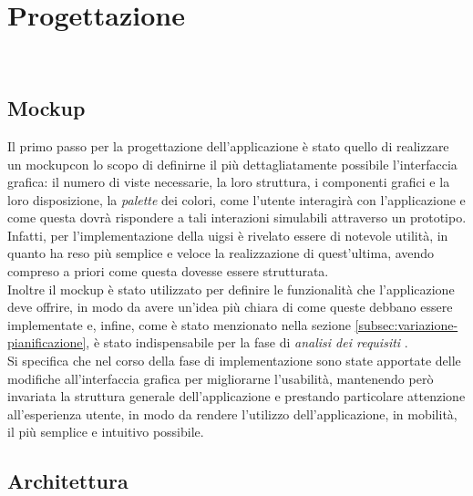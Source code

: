 \chapter{Progettazione}
\label{cap:progettazione}

\\

\section{Mockup}
\label{sec:mockup}

Il primo passo per la progettazione dell'applicazione è stato quello di realizzare un \gls{mockup}\glsoccur con lo scopo di definirne il più dettagliatamente possibile l'interfaccia grafica: il numero di viste necessarie, la loro struttura, i componenti grafici e la loro disposizione, la \emph{palette} dei colori, come l'utente interagirà con l'applicazione e come questa dovrà rispondere a tali interazioni simulabili attraverso un prototipo. Infatti, per l'implementazione della \gls{uig}\glsoccur si è rivelato essere di notevole utilità, in quanto ha reso più semplice e veloce la realizzazione di quest'ultima, avendo compreso a priori come questa dovesse essere strutturata.\\
Inoltre il \gls{mockup} è stato utilizzato per definire le funzionalità che l'applicazione deve offrire, in modo da avere un'idea più chiara di come queste debbano essere implementate e, infine, come è stato menzionato nella sezione \ref{subsec:variazione-pianificazione}, è stato indispensabile per la fase di \emph{analisi dei requisiti} .\\ 
Si specifica che nel corso della fase di implementazione sono state apportate delle modifiche all'interfaccia grafica per migliorarne l'usabilità, mantenendo però invariata la struttura generale dell'applicazione e prestando particolare attenzione all'esperienza utente, in modo da rendere l'utilizzo dell'applicazione, in mobilità, il più semplice e intuitivo possibile.

\section{Architettura}
\label{sec:architettura}

